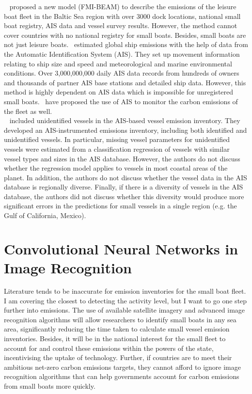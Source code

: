 ~ proposed a new model (FMI-BEAM) to describe the emissions of the leisure boat fleet in the Baltic Sea region with over 3000 dock locations, national small boat registry, AIS data and vessel survey results. However, the method cannot cover countries with no national registry for small boats. Besides, small boats are not just leisure boats.~ estimated global ship emissions with the help of data from the Automatic Identification System (AIS). They set up movement information relating to ship size and speed and meteorological and marine environmental conditions. Over 3,000,000,000 daily AIS data records from hundreds of owners and thousands of partner AIS base stations and detailed ship data. However, this method is highly dependent on AIS data which is impossible for unregistered small boats.~ have proposed the use of AIS to monitor the carbon emissions of the fleet as well.\\

~ included unidentified vessels in the AIS-based vessel emission inventory. They developed an AIS-instrumented emissions inventory, including both identified and unidentified vessels. In particular, missing vessel parameters for unidentified vessels were estimated from a classification regression of vessels with similar vessel types and sizes in the AIS database. However, the authors do not discuss whether the regression model applies to vessels in most coastal areas of the planet. In addition, the authors do not discuss whether the vessel data in the AIS database is regionally diverse. Finally, if there is a diversity of vessels in the AIS database, the authors did not discuss whether this diversity would produce more significant errors in the predictions for small vessels in a single region (e.g. the Gulf of California, Mexico).


\section{Convolutional Neural Networks in Image Recognition}
Literature tends to be inaccurate for emission inventories for the small boat fleet. I am covering the closest to detecting the activity level, but I want to go one step further into emissions. The use of available satellite imagery and advanced image recognition algorithms will allow researchers to identify small boats in any sea area, significantly reducing the time taken to calculate small vessel emission inventories. Besides, it will be in the national interest for the small fleet to account for and control these emissions within the powers of the state, incentivising the uptake of technology. Further, if countries are to meet their ambitious net-zero carbon emissions targets, they cannot afford to ignore image recognition algorithms that can help governments account for carbon emissions from small boats more quickly.\\

